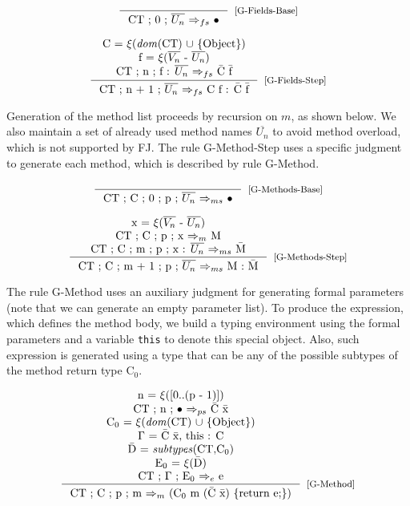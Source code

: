 \documentclass[tese,capa,english]{texufpel}
\begin{document}
\[
\inference{}
          {\textrm{CT ; 0 ; $\overline{U_n}$ $\Rightarrow_{fs}$ $\bullet$}}[\footnotesize{[G-Fields-Base]}] 
\]

\[
\inference{\textrm{C = $\xi$(\emph{dom}(CT) $\cup$ \{Object\})} \\
           \textrm{f = $\xi$($\overline{V_n}$ - $\overline{U_n}$)} \\
           \textrm{CT ; n ; f : $\overline{U_n}$ $\Rightarrow_{fs}$ \={C} \={f}}}
          {\textrm{CT ; n + 1 ; $\overline{U_n}$ $\Rightarrow_{fs}$ C f : \={C} \={f}}}[\footnotesize{[G-Fields-Step]}]
\]

Generation of the method list proceeds by recursion on $m$, as shown below. We also maintain a set of already used method names $\overline{U_n}$ to avoid method overload, which is not supported by FJ. The rule {\footnotesize G-Method-Step} uses a specific judgment to generate each method, which is described by rule {\footnotesize G-Method}.

\[
\inference{}
          {\textrm{CT ; C ; 0 ; p ; $\overline{U_n}$ $\Rightarrow_{ms}$ $\bullet$}}[\footnotesize{[G-Methods-Base]}]
\]

\[
\inference{\textrm{x = $\xi$($\overline{V_n}$ - $\overline{U_n}$)} \\
           \textrm{CT ; C ; p ; x $\Rightarrow_m$ M} \\
           \textrm{CT ; C ; m ; p ; x : $\overline{U_n}$ $\Rightarrow_{ms}$ \={M}}}
          {\textrm{CT ; C ; m + 1 ; p ; $\overline{U_n}$ $\Rightarrow_{ms}$ M : \={M}}}[\footnotesize{[G-Methods-Step]}]
\]

The rule {\footnotesize G-Method} uses an auxiliary judgment for generating formal parameters (note that we can generate an empty parameter list). To produce the expression, which defines the method body, we build a typing environment using the formal parameters and a variable \texttt{this} to denote this special object. Also, such expression is generated using a type that can be any of the possible subtypes of the method return type C$_0$.

\[
\inference{\textrm{n = $\xi$([$0..$(p - 1)])} \\
           \textrm{CT ; n ; $\bullet$ $\Rightarrow_{ps}$ \={C} \={x}} \\
           \textrm{C$_0$ = $\xi$(\emph{dom}(CT) $\cup$ \{Object\})} \\
           \textrm{$\Gamma$ = {\={C} \={x}, this : C}} \\
           \textrm{\={D} = \emph{subtypes}(CT,C$_0$)} \\
           \textrm{E$_0$ = $\xi$(\={D})} \\
           \textrm{CT ; $\Gamma$ ; E$_0$ $\Rightarrow_e$ e}}
          {\textrm{CT ; C ; p ; m $\Rightarrow_m$ (C$_0$ m (\={C} \={x}) \{return e;\})}}[\footnotesize{[G-Method]}]
\]
\end{document}
